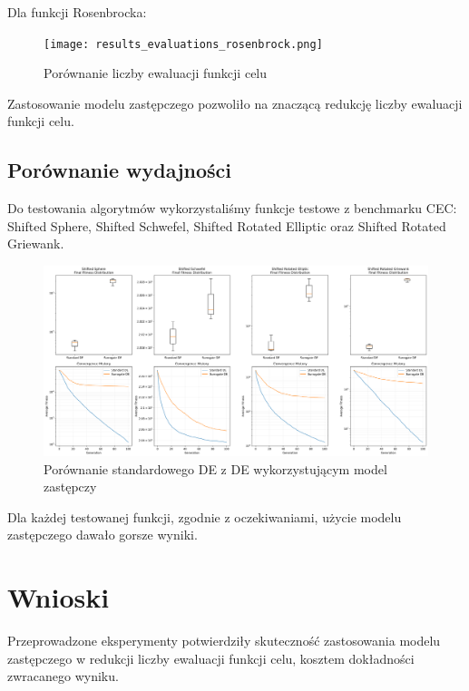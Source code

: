\documentclass{article}
\begin{document}
Dla funkcji Rosenbrocka:

\begin{figure}[H]
    \centering
    \texttt{[image: results\_evaluations\_rosenbrock.png]}
    \caption{Porównanie liczby ewaluacji funkcji celu}
    \label{fig:results_evaluations}
\end{figure}

Zastosowanie modelu zastępczego pozwoliło na znaczącą redukcję liczby ewaluacji funkcji celu. 

\subsection{Porównanie wydajności}

Do testowania algorytmów wykorzystaliśmy funkcje testowe z benchmarku CEC: Shifted Sphere, Shifted Schwefel, Shifted Rotated Elliptic oraz Shifted Rotated Griewank.

\begin{figure}[H]
    \centering
    \includegraphics[width=\textwidth]{comprehensive_results.png}
    \caption{Porównanie standardowego DE z DE wykorzystującym model zastępczy}
    \label{fig:comprehensive_results}
\end{figure}

Dla każdej testowanej funkcji, zgodnie z oczekiwaniami, użycie modelu zastępczego dawało gorsze wyniki.

\section{Wnioski}
Przeprowadzone eksperymenty potwierdziły skuteczność zastosowania modelu zastępczego w redukcji liczby ewaluacji funkcji celu, kosztem dokładności zwracanego wyniku.
\end{document}
